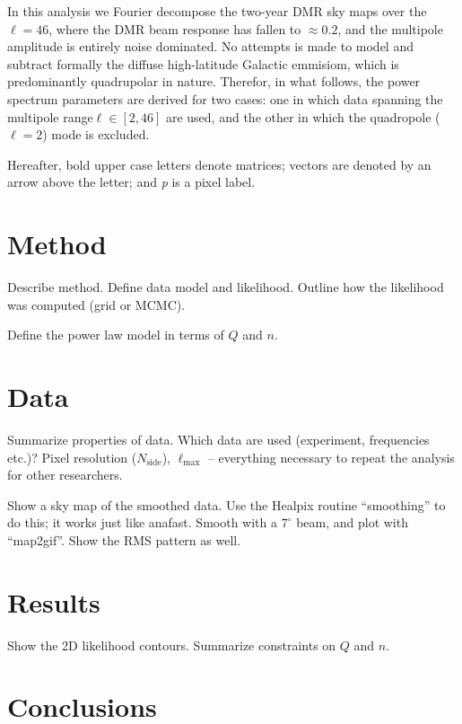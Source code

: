 \documentclass{emulateapj}
\begin{document}
  In this analysis we Fourier decompose the two-year DMR sky maps over the $\ell = 46$, where the DMR beam response has fallen to $\approx 0.2$, and the multipole amplitude is entirely noise dominated. No attempts is made to model and subtract formally the diffuse high-latitude Galactic emmisiom, which is predominantly quadrupolar in nature. Therefor, in what follows, the power spectrum parameters are derived for two cases: one in which data spanning the multipole range$\ell \in [2,46]$ are used, and the other in which the quadropole ($\ell = 2$) mode is excluded.

  Hereafter, bold upper case letters denote matrices; vectors are denoted by an arrow above the letter; and \textit{p} is a pixel label.

\section{Method}
\label{sec:method}


Describe method. Define data model and likelihood. Outline how the
likelihood was computed (grid or MCMC).

Define the power law model in terms of $Q$ and $n$. 

\section{Data}
\label{sec:data}

Summarize properties of data. Which data are used (experiment,
frequencies etc.)? Pixel resolution ($N_{\textrm{side}}$),
$\ell_{\textrm{max}}$ -- everything necessary to repeat the analysis
for other researchers.

Show a sky map of the smoothed data. Use the Healpix routine
``smoothing'' to do this; it works just like anafast. Smooth with a
$7^{\circ}$ beam, and plot with ``map2gif''. Show the RMS pattern as
well. 

\section{Results}
\label{sec:results}


Show the 2D likelihood contours. Summarize constraints on $Q$ and
$n$. 


\section{Conclusions}
\label{sec:conclusions}
\end{document}
